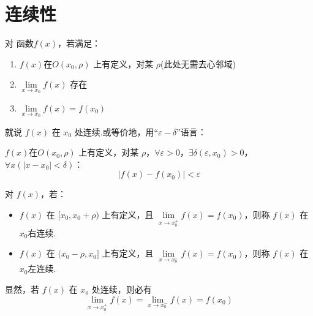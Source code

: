 \section{连续性}
\begin{definition}
	对 函数$f(x)$，若满足：
	\begin{enumerate}
		\item $f(x) $在$ O(x_0, \rho)$ 上有定义，对某 $\rho$(此处无需去心邻域)
		\item $\lim\limits_{x \to x_0} f(x)$ 存在
		\item $\lim\limits_{x \to x_0} f(x) = f(x_0)$
	\end{enumerate}
	
	就说 $f(x)$ 在 $x_0$ 处连续.或等价地，用“$\varepsilon-\delta$”语言：
	
	$f(x) $在$ O(x_0, \rho)$ 上有定义，对某 $\rho$，$\forall \varepsilon > 0$，$\exists \delta(\varepsilon, x_0)> 0$，$\forall x (|x - x_0| < \delta)$：
	\[
	|f(x) - f(x_0)| < \varepsilon
	\]
	
\end{definition}
\begin{definition}
	对 $f(x)$，若：
	\begin{itemize}
		\item $f(x)$ 在 $[x_0, x_0 + \rho)$ 上有定义，且 $\lim\limits_{x \to x_0^+} f(x) = f(x_0)$，则称 $f(x)$ 在$x_0$右连续.
		\item $f(x)$ 在 $(x_0 - \rho, x_0]$ 上有定义，且 $\lim\limits_{x \to x_0^-} f(x) = f(x_0)$，则称 $f(x)$ 在$x_0$左连续.
	\end{itemize}
	显然，若 $f(x)$ 在 $x_0$ 处连续，则必有
	\[
	\lim_{x \to x_0^+} f(x) = \lim_{x \to x_0^-} f(x) = f(x_0)
	\]
\end{definition}

